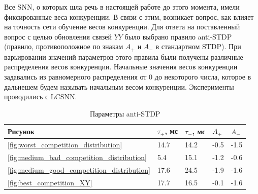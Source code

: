 \documentclass[a4paper]{article}
\begin{document}
Все SNN, о которых шла речь в настоящей работе до этого момента, имели фиксированные веса конкуренции. В связи с этим, возникает вопрос, как влияет на точность сети обучение весов конкуренции. Для ответа на поставленный вопрос с целью обновления связей $YY$ было выбрано правило anti-STDP (правило, противоположное по знакам $A_{+}$ и $A_{-}$ в стандартном STDP). При варьировании значений параметров этого правила были получены различные распределения весов конкуренции. Начальные значения весов конкуренции задавались из равномерного распределения от 0 до некоторого числа, которое в дальнешем будем называть начальным весом конкуренции. Эксперименты проводились с LCSNN.

\begin{table}
 \caption{Параметры anti-STDP}
\begin{center}
\begin{tabular}{|l|l|l|l|l|}
\hline
Рисунок & {$\tau_{+}$, мс} & {$\tau_{-}$, мс} & {$A_{+}$} & {$A_{-}$} \\
\hline
\ref{fig:worst_competition_distribution} & 14.7 & 14.2 & -0.5 & -1.5 \\
\hline
\ref{fig:medium_bad_competition_distribution} & 5.4 & 15.1 & -1.2 & -0.6 \\
\hline
\ref{fig:medium_good_competition_distribution} & 17.6 & 24.5 & -1.9 & -1.6 \\
\hline
\ref{fig:best_competition_XY} & 17.7 & 16.5 & -0.1 & -1.6\\
\hline
\end{tabular}
\end{center}
\end{table}
\end{document}

